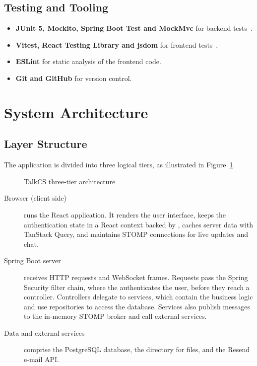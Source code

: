 \subsection*{Testing and Tooling}

\begin{itemize}
  \item \textbf{JUnit 5, Mockito, Spring Boot Test and MockMvc} for backend
    tests~\cite{junit,mockito}.
  \item \textbf{Vitest, React Testing Library and jsdom} for frontend
    tests~\cite{vitest,rtl}.
  \item \textbf{ESLint} for static analysis of the frontend code.
  \item \textbf{Git and GitHub} for version control.
\end{itemize}

\section{System Architecture}
\label{sec:architecture}

\subsection{Layer Structure}

The application is divided into three logical tiers, as illustrated in
Figure~\ref{fig:architecture}.

\begin{figure}[htbp]
  \centering
  \resizebox{\textwidth}{!}{}
  \caption{TalkCS three-tier architecture}
  \label{fig:architecture}
\end{figure}

\begin{description}
  \item[Browser (client side)] runs the React application. It renders the user
    interface, keeps the authentication state in a React context backed by
    , caches server data with TanStack Query, and maintains STOMP
    connections for live updates and chat.
  \item[Spring Boot server] receives HTTP requests and WebSocket frames. Requests pass
    the Spring Security filter chain, where the  authenticates the
    user, before they reach a controller. Controllers delegate to services, which
    contain the business logic and use repositories to access the database. Services
    also publish messages to the in-memory STOMP broker and call external services.
  \item[Data and external services] comprise the PostgreSQL database, the
     directory for files, and the Resend e-mail API.
\end{description}

